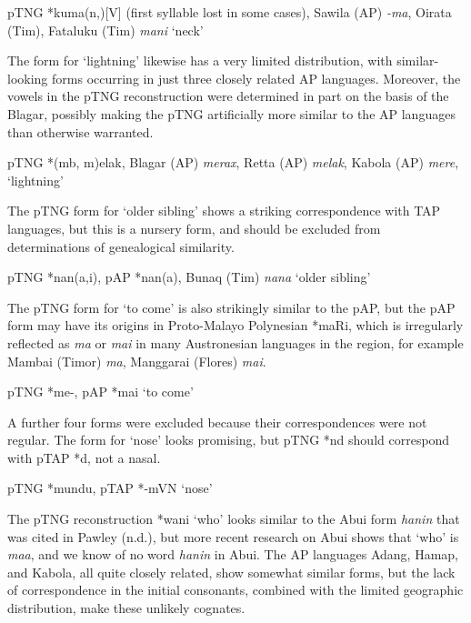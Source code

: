 \ea%
\label{ex:4:48}
\upshape    pTNG *kuma(n,{\ng})[V] (first syllable lost in some cases), Sawila (AP) \textit{-ma{\ng}}, Oirata (Tim), Fataluku (Tim) \textit{mani} `neck'   
\z

The form for `lightning' likewise has a very limited distribution, with similar-looking forms occurring in just three closely related AP languages. Moreover, the vowels in the pTNG reconstruction were determined in part on the basis of the Blagar, possibly making the pTNG artificially more similar to the AP languages than otherwise warranted.

\ea%
\label{ex:4:49}
\upshape    pTNG *(mb, m)elak, Blagar (AP) \textit{merax}, Retta (AP) \textit{melak}, Kabola (AP) \textit{mere}\textit{{\textglotstop}}, `lightning'  
\z

The pTNG form for `older sibling' shows a striking correspondence with TAP languages, but this is a nursery form, and should be excluded from determinations of genealogical similarity.

\ea%
\label{ex:4:50}
\upshape    pTNG *nan(a,i), pAP *nan(a), Bunaq (Tim) \textit{nana} `older sibling'  
\z

The pTNG form for `to come' is also strikingly similar to the pAP, but the pAP form may have its origins in Proto-Malayo Polynesian *maRi, which is irregularly reflected as \textit{ma }or \textit{mai }in many Austronesian languages in the region, for example Mambai (Timor) \textit{ma}, Manggarai (Flores) \textit{mai}.

\ea%
\label{ex:4:51}
\upshape    pTNG *me-, pAP *mai `to come'  
\z

A further four forms were excluded because their correspondences were not regular. The form for `nose' looks promising, but pTNG *nd should correspond with pTAP *d, not a nasal.

\ea%
\label{ex:4:52}
\upshape    pTNG *mundu, pTAP *-mVN `nose'   
\z

The pTNG reconstruction *wani `who' looks similar to the Abui form \textit{hanin} that was cited in Pawley (n.d.), but more recent research on Abui shows that `who' is \textit{maa}, and we know of  no word \textit{hanin} in Abui. The AP languages Adang, Hamap, and Kabola, all quite closely related, show somewhat similar forms, but the lack of correspondence in the initial consonants, combined with the limited geographic distribution, make these unlikely cognates.

